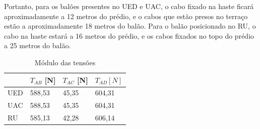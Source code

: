 Portanto, para os balões presentes no UED e UAC, o cabo fixado na haste ficará aproximadamente a 12 metros do prédio, e o cabos que estão presos no terraço estão a aproximadamente 18 metros do balão. Para o balão posicionado no RU, o cabo na haste estará a 16 metros do prédio, e os cabos fixados no topo do prédio a 25 metros do balão.

\begin{table}[H]
\centering
\begin{tabular}{l|l|l|l|}
\cline{2-4}
 & $T_{AB}$ [N] & $T_{AC}$ [N] & $T_{AD} [N]$ \\ \hline
\multicolumn{1}{|l|}{UED} & 588,53 & 45,35 & 604,31 \\ \hline
\multicolumn{1}{|l|}{UAC} & 588,53 & 45,35 & 604,31 \\ \hline
\multicolumn{1}{|l|}{RU} & 585,13 & 42,28 & 606,14 \\ \hline
\end{tabular}
\caption{ Módulo das tensões}
\label{table:modTensoes}
\end{table}
